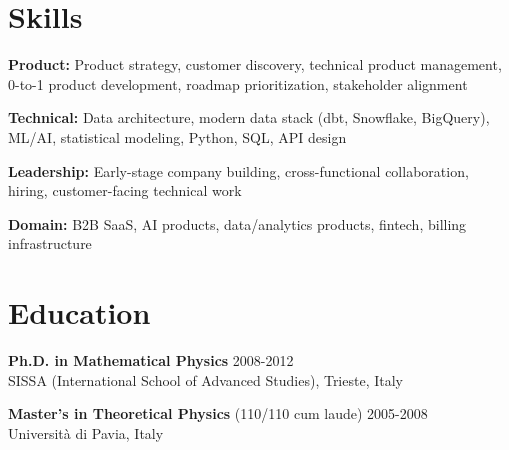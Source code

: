 \documentclass[10pt,a4paper]{article}
\begin{document}
\section*{Skills}

\textbf{Product:} Product strategy, customer discovery, technical product management, 0-to-1 product development, roadmap prioritization, stakeholder alignment

\textbf{Technical:} Data architecture, modern data stack (dbt, Snowflake, BigQuery), ML/AI, statistical modeling, Python, SQL, API design

\textbf{Leadership:} Early-stage company building, cross-functional collaboration, hiring, customer-facing technical work

\textbf{Domain:} B2B SaaS, AI products, data/analytics products, fintech, billing infrastructure

\section*{Education}

\noindent
\textbf{Ph.D. in Mathematical Physics} \hfill {\small\color{darkgray} 2008-2012} \\
SISSA (International School of Advanced Studies), Trieste, Italy

\noindent
\textbf{Master's in Theoretical Physics} (110/110 cum laude) \hfill {\small\color{darkgray} 2005-2008} \\
Università di Pavia, Italy
\end{document}
